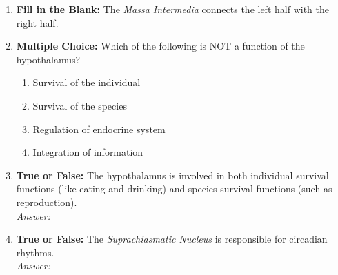 \begin{enumerate}[label=\textbf{Q1.10.\arabic*}]
      \item \textbf{Fill in the Blank:} The \textit{Massa Intermedia} connects the left \underline{\hspace{3cm}} half with the right half. \\

      \item \textbf{Multiple Choice:} Which of the following is NOT a function of the hypothalamus?
            \begin{enumerate}[label=(\Alph*)]
                  \item Survival of the individual
                  \item Survival of the species
                  \item Regulation of endocrine system
                  \item Integration of information
            \end{enumerate}



      \item \textbf{True or False:} The hypothalamus is involved in both individual survival functions (like eating and drinking) and species survival functions (such as reproduction). \\
            \textit{Answer:} %


      \item \textbf{True or False:} The \textit{Suprachiasmatic Nucleus} is responsible for circadian rhythms. \\
            \textit{Answer:} %


\end{enumerate}
